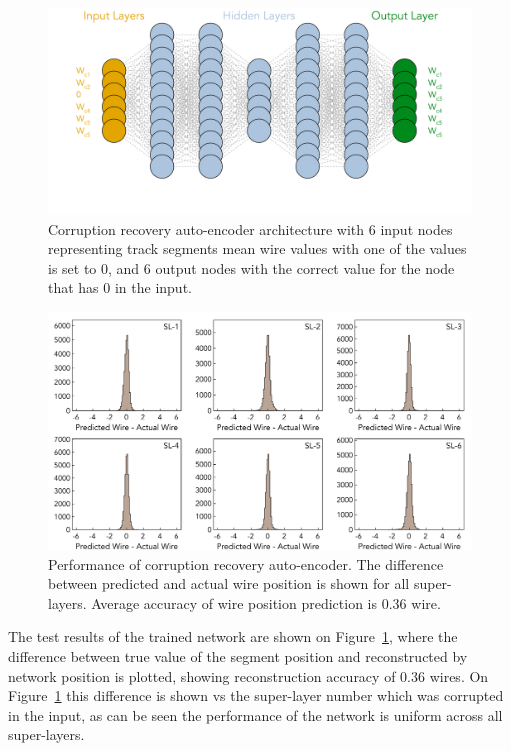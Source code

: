  \begin{figure}[!ht]
\begin{center}
\includegraphics[width=4.5in]{images/aue_diagram.pdf}
\caption {Corruption recovery auto-encoder architecture with 6 input nodes representing track segments mean wire values with one of the values is set to 0, and 6 output nodes with the correct value for the node that has 0 in the input. }
 \label{autoencoder:architecture}
 \end{center}
\end{figure}

 \begin{figure}[!ht]
\begin{center}
\includegraphics[width=6.0in]{images/encoder_performance.pdf}
\caption {Performance of corruption recovery auto-encoder. The difference between predicted and actual wire position 
is shown for all super-layers. Average accuracy of wire position prediction is  $0.36$ wire.}
 \label{autoencoder:performance}
 \end{center}
\end{figure}
The test results of the trained network are shown on Figure~\ref{autoencoder:architecture}, where the difference between true value 
of the segment position and reconstructed by network position is plotted, showing reconstruction accuracy of $0.36$ wires.
On Figure~\ref{autoencoder:architecture} this difference is shown vs the super-layer number which was corrupted in the input, 
as can be seen the performance of the network is uniform across all super-layers.



